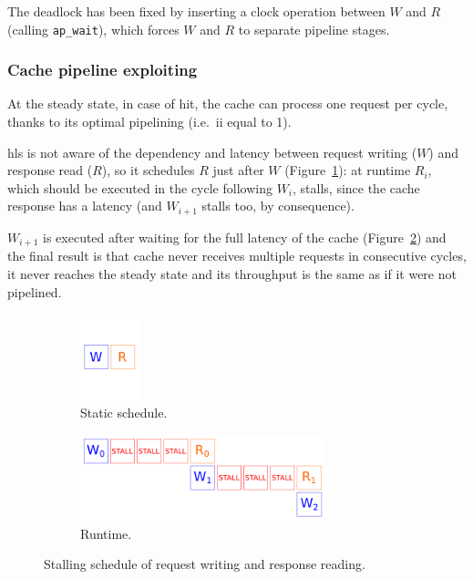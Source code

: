 \documentclass[11pt,a4paper,oneside]{memoir}
\begin{document}
The deadlock has been fixed by inserting a clock operation between $W$ and $R$
(calling \texttt{ap\_wait}), which forces $W$ and $R$ to separate pipeline
stages.

\subsubsection{Cache pipeline exploiting}
At the steady state, in case of hit, the cache can process one request per
cycle, thanks to its optimal pipelining (i.e.\ \ac{ii} equal to 1).

\ac{hls} is not aware of the dependency and latency between request writing
($W$) and response read ($R$), so it schedules $R$ just after $W$
(Figure~\ref{subfig:actual_sched_static}): at runtime $R_i$, which should be
executed in the cycle following $W_i$, stalls, since the cache response has a
latency (and $W_{i+1}$ stalls too, by consequence).

$W_{i+1}$ is executed after waiting for the full latency of the cache
(Figure~\ref{subfig:actual_sched_run}) and the final result is that cache never
receives multiple requests in consecutive cycles, it never reaches the steady
state and its throughput is the same as if it were not pipelined.

\begin{figure}[!htb]
	\centering
	\begin{subfigure}[b]{.3\textwidth}
		\centering
		\includegraphics[height=2.5cm]{actual_schedule_static}
		\caption{Static schedule.}
		\label{subfig:actual_sched_static}
	\end{subfigure}
	\hfill
	\begin{subfigure}[b]{.68\textwidth}
		\centering
		\includegraphics[height=2.5cm]{actual_schedule_run}
		\caption{Runtime.}
		\label{subfig:actual_sched_run}
	\end{subfigure}
	\caption{Stalling schedule of request writing and response reading.}
	\label{fig:actual_sched}
\end{figure}
\end{document}
